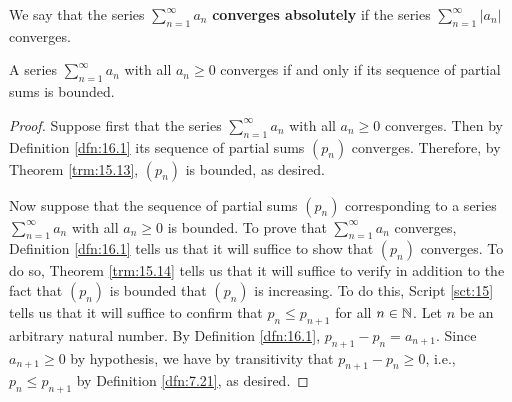 \documentclass[../main.tex]{subfiles}
\begin{document}
\begin{definition}\label{dfn:16.9}
    We say that the series $\sum_{n=1}^\infty a_n$ \textbf{converges absolutely} if the series $\sum_{n=1}^\infty|a_n|$ converges.
\end{definition}

\begin{lemma}\label{lem:16.10}
    A series $\sum_{n=1}^\infty a_n$ with all $a_n\geq 0$ converges if and only if its sequence of partial sums is bounded.
    \begin{proof}
        Suppose first that the series $\sum_{n=1}^\infty a_n$ with all $a_n\geq 0$ converges. Then by Definition \ref{dfn:16.1} its sequence of partial sums $(p_n)$ converges. Therefore, by Theorem \ref{trm:15.13}, $(p_n)$ is bounded, as desired.\par
        Now suppose that the sequence of partial sums $(p_n)$ corresponding to a series $\sum_{n=1}^\infty a_n$ with all $a_n\geq 0$ is bounded. To prove that $\sum_{n=1}^\infty a_n$ converges, Definition \ref{dfn:16.1} tells us that it will suffice to show that $(p_n)$ converges. To do so, Theorem \ref{trm:15.14} tells us that it will suffice to verify in addition to the fact that $(p_n)$ is bounded that $(p_n)$ is increasing. To do this, Script \ref{sct:15} tells us that it will suffice to confirm that $p_n\leq p_{n+1}$ for all $n\in\mathbb{N}$. Let $n$ be an arbitrary natural number. By Definition \ref{dfn:16.1}, $p_{n+1}-p_n=a_{n+1}$. Since $a_{n+1}\geq 0$ by hypothesis, we have by transitivity that $p_{n+1}-p_n\geq 0$, i.e., $p_n\leq p_{n+1}$ by Definition \ref{dfn:7.21}, as desired.
    \end{proof}
\end{lemma}
\end{document}
